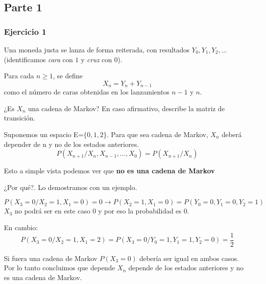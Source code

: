 \subsection{Parte 1}
\subsubsection{Ejercicio 1}
\begin{exercise}
Una moneda justa se lanza de forma reiterada, con resultados $Y_0, Y_1, Y_2, \ldots$ 
(identificamos \emph{cara} con $1$ y \emph{cruz} con $0$).  

Para cada $n \geq 1$, se define
\[
X_n = Y_n + Y_{n-1}
\]
como el número de caras obtenidas en los lanzamientos $n-1$ y $n$.  

¿Es $X_n$ una cadena de Markov? En caso afirmativo, describe la matriz de transición.
\end{exercise}

Suponemos un espacio E=$\{0,1,2\}$. Para que sea cadena de Markov, $X_n$ deberá depender de n y no de los estados anteriores.
\[
P\left(X_{n+1}/ X_n, X_{n-1},\dots, X_0\right) = P\left(X_{n+1}/ X_n\right)
\]

Esto a simple vista podemos ver que \textbf{no es una cadena de Markov}

¿Por qué?. Lo demostramos con un ejemplo.

\[
P \left(X_3 = 0 / X_2 =1, X_1=0\right) = 0 \rightarrow P \left( X_2 =1,X_1=0\right) = P(Y_0=0,Y_1=0,Y_2=1)
\]
$X_3$ no podrá ser en este caso 0 y por eso la probabilidad es 0.

En cambio:
\[
P\left(X_3=0 / X_2=1, X_1=2\right) = P \left( X_3 =0 / Y_0 = 1,Y_1 =1, Y_2=0\right) = \frac{1}{2}
\]

Si fuera una cadena de Markov $P(X_3=0)$ debería ser igual en ambos casos. Por lo tanto concluimos que depende $X_n$ depende de los estados anteriores y no es una cadena de Markov.

